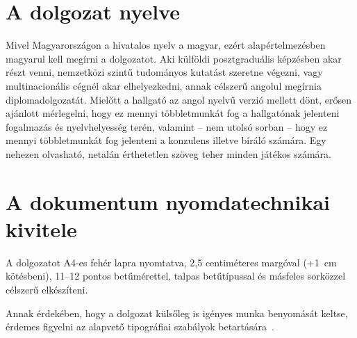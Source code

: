 \section{A dolgozat nyelve}
Mivel Magyarországon a hivatalos nyelv a magyar, ezért alapértelmezésben magyarul kell megírni a dolgozatot. Aki külföldi posztgraduális képzésben akar részt venni, nemzetközi szintű tudományos kutatást szeretne végezni, vagy multinacionális cégnél akar elhelyezkedni, annak célszerű angolul megírnia diplomadolgozatát. Mielőtt a hallgató az angol nyelvű verzió mellett dönt, erősen ajánlott mérlegelni, hogy ez mennyi többletmunkát fog a hallgatónak jelenteni fogalmazás és nyelvhelyesség terén, valamint -- nem utolsó sorban -- hogy ez mennyi többletmunkát fog jelenteni a konzulens illetve bíráló számára. Egy nehezen olvasható, netalán érthetetlen szöveg teher minden játékos számára.

\section{A dokumentum nyomdatechnikai kivitele}
A dolgozatot A4-es fehér lapra nyomtatva, 2,5 centiméteres margóval (+1~cm kötésbeni), 11--12 pontos betűmérettel, talpas betűtípussal és másfeles sorközzel célszerű elkészíteni.

Annak érdekében, hogy a dolgozat külsőleg is igényes munka benyomását keltse, érdemes figyelni az alapvető tipográfiai szabályok betartására~\cite{Jeney}.
